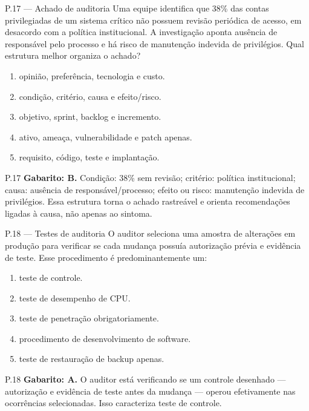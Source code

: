 \begin{questao}{ P.17 — Achado de auditoria}
Uma equipe identifica que 38\% das contas privilegiadas de um sistema crítico não possuem revisão periódica de acesso, em desacordo com a política institucional. A investigação aponta ausência de responsável pelo processo e há risco de manutenção indevida de privilégios. Qual estrutura melhor organiza o achado?
\begin{enumerate}[label=\Alph*)]
\item opinião, preferência, tecnologia e custo.
\item condição, critério, causa e efeito/risco.
\item objetivo, sprint, backlog e incremento.
\item ativo, ameaça, vulnerabilidade e patch apenas.
\item requisito, código, teste e implantação.
\end{enumerate}
\end{questao}
\begin{solucao}{P.17}
\textbf{Gabarito: B.} Condição: 38\% sem revisão; critério: política institucional; causa: ausência de responsável/processo; efeito ou risco: manutenção indevida de privilégios. Essa estrutura torna o achado rastreável e orienta recomendações ligadas à causa, não apenas ao sintoma.
\end{solucao}

\begin{questao}{ P.18 — Testes de auditoria}
O auditor seleciona uma amostra de alterações em produção para verificar se cada mudança possuía autorização prévia e evidência de teste. Esse procedimento é predominantemente um:
\begin{enumerate}[label=\Alph*)]
\item teste de controle.
\item teste de desempenho de CPU.
\item teste de penetração obrigatoriamente.
\item procedimento de desenvolvimento de software.
\item teste de restauração de backup apenas.
\end{enumerate}
\end{questao}
\begin{solucao}{P.18}
\textbf{Gabarito: A.} O auditor está verificando se um controle desenhado — autorização e evidência de teste antes da mudança — operou efetivamente nas ocorrências selecionadas. Isso caracteriza teste de controle.
\end{solucao}

